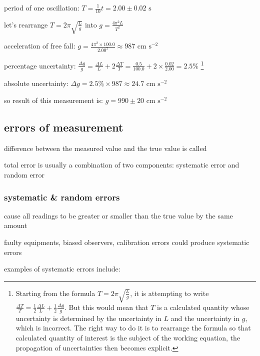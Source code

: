 \sol period of one oscillation: $T = \frac{1}{10}t = 2.00 \pm 0.02 \text{ s}$

let's rearrange $T=2\pi\sqrt{\frac{L}{g}}$ into $g = \frac{4\pi^2L}{T^2}$

acceleration of free fall: $g = \frac{4\pi^2 \times 100.0}{2.00^2} \approx 987 \text{ cm s}^{-2}$

\eqyskip percentage uncertainty: $\frac{\Delta g}{g} = \frac{\Delta L}{L} + 2\frac{\Delta T}{T} = \frac{0.5}{100.0} + 2\times\frac{0.02}{2.00} = 2.5\%$ \footnote{Starting from the formula $T=2\pi\sqrt{\frac{L}{g}}$, it is attempting to write $\frac{\Delta T}{T} = \frac{1}{2}\frac{\Delta L}{L} + \frac{1}{2}\frac{\Delta g}{g}$. But this would mean that $T$ is a calculated quantity whose uncertainty is determined by the uncertainty in $L$ and the uncertainty in $g$, which is incorrect. The right way to do it is to rearrange the formula so that calculated quantity of interest is the subject of the working equation, the propagation of uncertainties then becomes explicit.}

absolute uncertainty: $\Delta g = 2.5\% \times 987 \approx 24.7 \text{ cm s}^{-2}$

so result of this measurement is: $ g = 990 \pm 20 \text{ cm s}^{-2}$ \eoe




\subsection{errors of measurement}

difference between the measured value and the true value is called 

total error is usually a combination of two components: systematic error and random error

\subsubsection{systematic \& random errors}

\begin{ilight}
	 cause all readings to be greater or smaller than the true value by the same amount
\end{ilight}

\cmt faulty equipments, biased observers, calibration errors could produce systematic errors

examples of systematic errors include:

